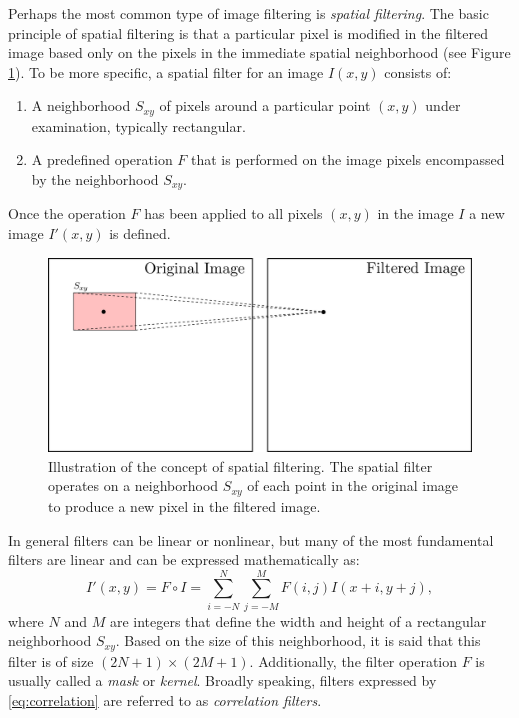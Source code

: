 Perhaps the most common type of image filtering is \textit{spatial filtering}.
The basic principle of spatial filtering is that a particular pixel is modified in the filtered image based only on the pixels in the immediate spatial neighborhood (see Figure \ref{fig:spatial_filter_concept_fig}). To be more specific, a spatial filter for an image $I(x,y)$ consists of:
\begin{enumerate}
    \item A neighborhood $S_{xy}$ of pixels around a particular point $(x,y)$ under examination, typically rectangular.
    \item A predefined operation $F$ that is performed on the image pixels encompassed by the neighborhood $S_{xy}$.
\end{enumerate}
Once the operation $F$ has been applied to all pixels $(x,y)$ in the image $I$ a new image $I'(x,y)$ is defined.
\begin{figure}[ht]
  \centering
  \includegraphics[width=.75\textwidth]{tex/figs/ch10_figs/spatialfiltering.png}
    \caption{Illustration of the concept of spatial filtering. The spatial filter operates on a neighborhood $S_{xy}$ of each point in the original image to produce a new pixel in the filtered image.}
    \label{fig:spatial_filter_concept_fig}
\end{figure}

In general filters can be linear or nonlinear, but many of the most fundamental filters are linear and can be expressed mathematically as:
\begin{equation}
  \label{eq:correlation}
    I'(x,y) = F \circ I = \sum_{i=-N}^N \sum_{j=-M}^M F(i,j)I(x+i,y+j),
\end{equation}
where $N$ and $M$ are integers that define the width and height of a rectangular neighborhood $S_{xy}$. Based on the size of this neighborhood, it is said that this filter is of size $(2N+1) \times (2M+1)$. Additionally, the filter operation $F$ is usually called a \textit{mask} or \textit{kernel}. Broadly speaking, filters expressed by \eqref{eq:correlation} are referred to as \textit{correlation filters}.

